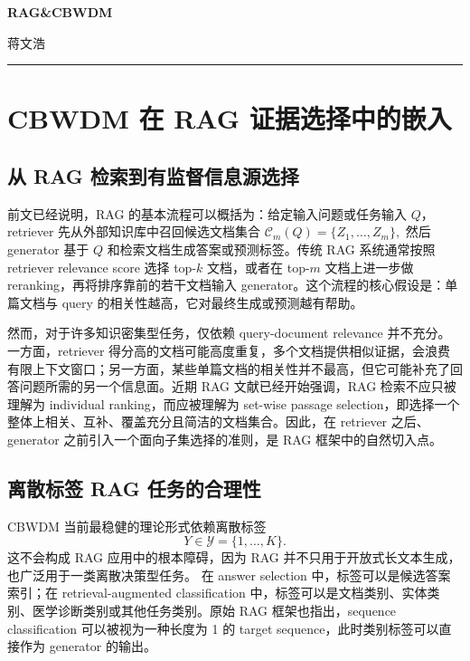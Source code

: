 \documentclass[UTF8,a4paper,12pt,oneside]{ctexart}
\numberwithin{equation}{section}
\begin{document}
\thispagestyle{fancy}

\begin{center}
    {\Huge\bfseries RAG\&CBWDM\par}
    \vspace{0.75em}
    {\large 蒋文浩\par}
    \rule{0.72\textwidth}{0.4pt}
\end{center}
\vspace{0.7em}

\section{CBWDM 在 RAG 证据选择中的嵌入}

\subsection{从 RAG 检索到有监督信息源选择}

前文已经说明，RAG 的基本流程可以概括为：给定输入问题或任务输入 \(Q\)，retriever 先从外部知识库中召回候选文档集合
\(\mathcal C_m(Q)=\{Z_1,\ldots,Z_m\},\)
然后 generator 基于 \(Q\) 和检索文档生成答案或预测标签。传统 RAG 系统通常按照 retriever relevance score 选择 top-\(k\) 文档，或者在 top-\(m\) 文档上进一步做 reranking，再将排序靠前的若干文档输入 generator。这个流程的核心假设是：单篇文档与 query 的相关性越高，它对最终生成或预测越有帮助。

然而，对于许多知识密集型任务，仅依赖 query-document relevance 并不充分。一方面，retriever 得分高的文档可能高度重复，多个文档提供相似证据，会浪费有限上下文窗口；另一方面，某些单篇文档的相关性并不最高，但它可能补充了回答问题所需的另一个信息面。近期 RAG 文献已经开始强调，RAG 检索不应只被理解为 individual ranking，而应被理解为 set-wise passage selection，即选择一个整体上相关、互补、覆盖充分且简洁的文档集合。因此，在 retriever 之后、generator 之前引入一个面向子集选择的准则，是 RAG 框架中的自然切入点。

\subsection{离散标签 RAG 任务的合理性}

CBWDM 当前最稳健的理论形式依赖离散标签
\[
    Y\in\mathcal Y=\{1,\ldots,K\}.
\]
这不会构成 RAG 应用中的根本障碍，因为 RAG 并不只用于开放式长文本生成，也广泛用于一类离散决策型任务。
在 answer selection 中，标签可以是候选答案索引；在 retrieval-augmented classification 中，标签可以是文档类别、实体类别、医学诊断类别或其他任务类别。原始 RAG 框架也指出，sequence classification 可以被视为一种长度为 1 的 target sequence，此时类别标签可以直接作为 generator 的输出。
\end{document}
